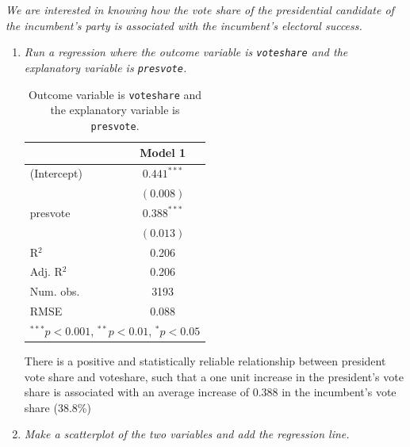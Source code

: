 \documentclass[12pt,letterpaper]{article}
\begin{document}
	\noindent \emph{We are interested in knowing how the vote share of the presidential candidate of the incumbent's party is associated with the incumbent's electoral success.}
	\vspace{.25cm}
	\begin{enumerate}
		\item \emph{Run a regression where the outcome variable is \texttt{voteshare} and the explanatory variable is \texttt{presvote}.}

\begin{table}[h!]
	\begin{center}
		\caption{\footnotesize{Outcome variable is \texttt{voteshare} and the explanatory variable is \texttt{presvote}.}} %
		\begin{tabular}{l c }
			\hline
			& Model 1 \\
			\hline
			(Intercept) & $0.441^{***}$ \\
            & $(0.008)$     \\
presvote    & $0.388^{***}$ \\
            & $(0.013)$     \\
\hline
R$^2$       & 0.206         \\
Adj. R$^2$  & 0.206         \\
Num. obs.   & 3193          \\
RMSE        & 0.088         \\
			\hline
			\multicolumn{2}{l}{\scriptsize{$^{***}p<0.001$, $^{**}p<0.01$, $^*p<0.05$}}
		\end{tabular}
		
	\end{center}
\end{table}


\noindent There is a positive and statistically reliable relationship between president vote share and voteshare, such that a one unit increase in the president's vote share is associated with an average increase of 0.388 in the incumbent's vote share (38.8\%)	
	\vspace{.25cm}
	
		\item \emph{Make a scatterplot of the two variables and add the regression line. }
			\vspace{.25cm}


\end{enumerate}
\end{document}

